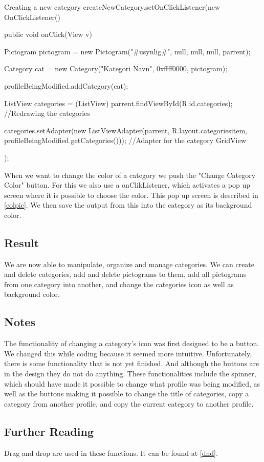 \begin{source}[{mc6}]{Creating a new category}
createNewCategory.setOnClickListener(new OnClickListener() 
		{
			public void onClick(View v) 
			{
				Pictogram pictogram = new Pictogram("#usynlig#", null, null, null, parrent);
				
				Category cat = new Category("Kategori Navn", 0xffff0000, pictogram);
				
				profileBeingModified.addCategory(cat);
				
				ListView categories = (ListView) parrent.findViewById(R.id.categories); //Redrawing the categories
				
				categories.setAdapter(new ListViewAdapter(parrent, R.layout.categoriesitem, profileBeingModified.getCategories())); 
				//Adapter for the category GridView
			}
		});
\end{source}
When we want to change the color of a category we push the "Change Category Color" button. 
For this we also use a onClikListener, which activates a pop up screen where it is possible to choose the color. This pop up screen is described in \autoref{colpic}.
We then save the output from this into the category as its background color. 

\subsection*{Result}
We are now able to manipulate, organize and manage categories. We can create and delete categories,
add and delete pictograms to them, add all pictograms from one category into another, and 
change the categories icon as well as background color.


\subsection*{Notes}
The functionality of changing a category's icon was first designed to be a button. We changed this while coding because it seemed more intuitive.\newline 
Unfortunately, there is some functionality that is not yet finished. And although the buttons are in the design they do not do anything. 
These functionalities include the spinner, which should have made it possible to change what profile was being modified, as well as the buttons making it possible to change the title of categories, copy a category from another profile, and copy the current category to another profile. 


\subsection*{Further Reading}
Drag and drop are used in these functions. It can be found at \autoref{dnd}.